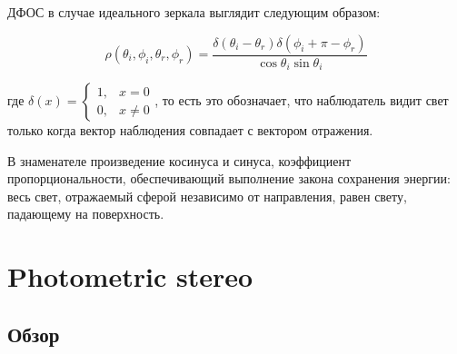 \documentclass[12pt]{article}
\begin{document}
ДФОС в случае идеального зеркала выглядит следующим образом:

\begin{equation}
  \rho(\theta_i,\phi_i,\theta_r,\phi_r)=\frac{\delta(\theta_i-\theta_r)\delta(\phi_i+\pi-\phi_r)}{\cos\theta_i\sin\theta_i}
\end{equation}

где $\delta(x)=\begin{cases}
    1, & x=0    \\
    0, & x\neq0
  \end{cases}$, то есть это обозначает, что наблюдатель видит свет только когда вектор наблюдения совпадает с вектором отражения.

В знаменателе произведение косинуса и синуса, коэффициент пропорциональности, обеспечивающий выполнение закона сохранения энергии: весь свет, отражаемый сферой независимо от направления, равен свету, падающему на поверхность.

\newpage

\section{Photometric stereo}

\subsection{Обзор}
\end{document}
